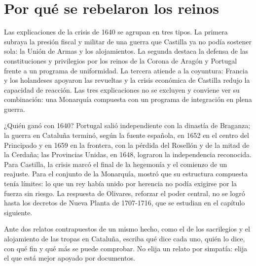 \documentclass{book}
\begin{document}

\section{Por qué se rebelaron los reinos}

Las explicaciones de la crisis de 1640 se agrupan en tres tipos. La primera subraya la presión fiscal y militar de una guerra que Castilla ya no podía sostener sola: la Unión de Armas y los alojamientos. La segunda destaca la defensa de las constituciones y privilegios por los reinos de la Corona de Aragón y Portugal frente a un programa de uniformidad. La tercera atiende a la coyuntura: Francia y los holandeses apoyaron las revueltas y la crisis económica de Castilla redujo la capacidad de reacción. Las tres explicaciones no se excluyen y conviene ver su combinación: una Monarquía compuesta con un programa de integración en plena guerra.


¿Quién ganó con 1640?
Portugal salió independiente con la dinastía de Braganza; la guerra en Cataluña terminó, según la fuente española, en 1652 en el centro del Principado y en 1659 en la frontera, con la pérdida del Rosellón y de la mitad de la Cerdaña; las Provincias Unidas, en 1648, lograron la independencia reconocida. Para Castilla, la crisis marcó el final de la hegemonía y el comienzo de un reajuste. Para el conjunto de la Monarquía, mostró que su estructura compuesta tenía límites: lo que un rey había unido por herencia no podía exigirse por la fuerza sin riesgo. La respuesta de Olivares, reforzar el poder central, no se logró hasta los decretos de Nueva Planta de 1707-1716, que se estudian en el capítulo siguiente.


\begin{tcolorbox}[title={Consejo}, studiumtip, breakable]

Ante dos relatos contrapuestos de un mismo hecho, como el de los sacrilegios y el alojamiento de las tropas en Cataluña, escriba qué dice cada uno, quién lo dice, con qué fin y qué más se puede comprobar. No elija un relato por simpatía: elija el que está mejor apoyado por documentos.

\end{tcolorbox}
\end{document}
